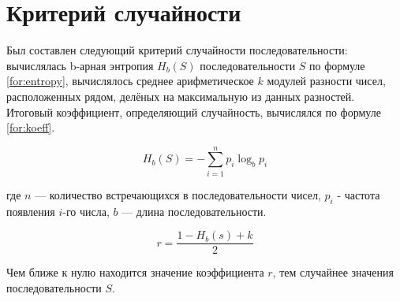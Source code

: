 \section{Критерий случайности}

Был составлен следующий критерий случайности последовательности: вычислялась b-арная энтропия $H_b(S)$ последовательности $S$ по формуле \ref{for:entropy}, вычислялось среднее арифметическое $k$ модулей разности чисел, расположенных рядом, делёных на максимальную из данных разностей. Итоговый коэффициент, определяющий случайность, вычислялся по формуле \ref{for:koeff}.

\begin{equation}
	\label{for:entropy}
	H_b(S) = - \sum_{i=1}^{n} p_i \log_b p_i
\end{equation}

где $n$ --- количество встречающихся в последовательности чисел, $p_i$ - частота появления $i$-го числа, $b$ --- длина последовательности.

\begin{equation}
	\label{for:koeff}
	r = \frac{1 - H_b(s) + k}{2}
\end{equation}


Чем ближе к нулю находится значение коэффициента $r$, тем случайнее значения последовательности $S$.

